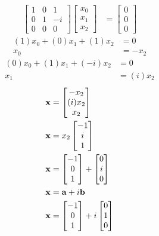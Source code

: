 \documentclass{article}
\begin{document}
\begin{align*}
	\begin{bmatrix}
		1 & 0 & 1 \\
		0 & 1 & -i \\
		0 & 0 & 0
	\end{bmatrix}
	\begin{bmatrix} x_0 \\ x_1 \\ x_2 \end{bmatrix} & =
	\begin{bmatrix} 0 \\ 0 \\ 0 \end{bmatrix}
\end{align*}
\begin{align*}
	(1)x_0 + (0)x_1 + (1)x_2 & = 0 \\
	x_0 & = -x_2
\end{align*}
\begin{align*}
	(0)x_0 + (1)x_1 + (-i)x_2 & = 0 \\
	x_1 & = (i)x_2
\end{align*}
\begin{align*}
	\mathbf{x} & = \begin{bmatrix} -x_2 \\ (i)x_2 \\ x_2 \end{bmatrix} \\
	\mathbf{x} & = x_2 \begin{bmatrix} -1 \\ i \\ 1 \end{bmatrix} \\
	\mathbf{x} & = \begin{bmatrix} -1 \\ 0 \\ 1 \end{bmatrix} + \begin{bmatrix} 0 \\ i \\ 0 \end{bmatrix} \\
	\mathbf{x} & = \mathbf{a} + i\mathbf{b} \\
	\mathbf{x} & = \begin{bmatrix} -1 \\ 0 \\ 1 \end{bmatrix} + i\begin{bmatrix} 0 \\ 1 \\ 0 \end{bmatrix}
\end{align*}
\end{document}
